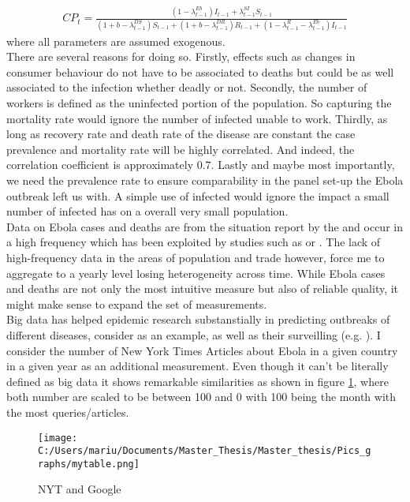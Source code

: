 \documentclass{article}
\begin{document}
\begin{align*}
CP_t = \frac{(1 - \lambda^{Eb}_{t-1})I_{t-1} + \lambda_{t-1}^{SI} S_{t-1} }{(1+b-\lambda_{t-1}^{DS})S_{t-1} + (1+b-\lambda_{t-1}^{DR})R_{t-1} + (1 - \lambda_{t-1}^{R}- \lambda_{t-1}^{Eb})I_{t-1}}
\end{align*}
where all parameters are assumed exogenous.\\
There are several reasons for doing so. Firstly, effects such as changes in consumer behaviour do not have to be associated to deaths but could be  as well associated to the infection whether deadly or not. Secondly, the number of workers is defined as the uninfected portion of the population. So capturing the mortality rate would ignore the number of infected unable to work. Thirdly, as long as recovery rate and death rate of the disease are constant the case prevalence and mortality rate will be highly correlated. And indeed, the correlation coefficient is approximately $0.7$. Lastly and maybe most importantly, we need the prevalence rate to ensure comparability in the panel set-up the Ebola outbreak left us with. A simple use of infected would ignore the impact a small number of infected has on a overall very small population. \\

Data on Ebola cases and deaths are from the situation report by the \cite{whoebola} and occur in a high frequency which has been exploited by studies such as \cite{gonzalez2017epidemics} or \cite{althaus2014estimating}. The lack of high-frequency data in the areas of population and trade however, force me to aggregate to a yearly level losing heterogeneity across time. While Ebola cases and deaths are not only the most intuitive measure but also of reliable quality, it might make sense to expand the set of measurements.\\
Big data has helped epidemic research substanstially in predicting outbreaks of different diseases, consider \cite{ginsberg2009detecting} as an example, as well as their surveilling (e.g. \cite{chan2011using}).
I consider the number of New York Times Articles about Ebola in a given country in a given year as an additional measurement. Even though it can't be literally defined as big data it shows remarkable similarities as shown in figure \ref{NYT and Google}, where both number are scaled to be between 100 and 0 with 100 being the month with the most queries/articles.

\begin{figure}[!ht]
\begin{center}\caption{ NYT and Google \label{NYT and Google}}
\texttt{[image: C:/Users/mariu/Documents/Master\_Thesis/Master\_thesis/Pics\_graphs/mytable.png]}\\
\end{center}
\end{figure}
\end{document}
